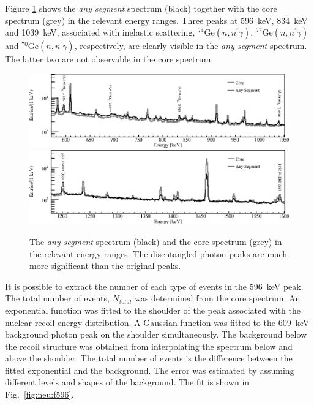 Figure \ref{fig:neu:cas} shows the \emph{any segment} spectrum (black) together with the core spectrum (grey) in the relevant energy ranges. Three peaks at 596~keV, 834~keV and 1039~keV, associated with inelastic scattering, $^{74}$Ge$(n, n^\prime\gamma)$, $^{72}$Ge$(n, n^\prime\gamma)$ and $^{70}$Ge$(n, n^\prime\gamma)$, respectively, are clearly visible in the \emph{any segment} spectrum. The latter two are not observable in the core spectrum.

\begin{figure}[tbhp]
\centering
\includegraphics[width=\textwidth,clip]{spe_casp}
\includegraphics[width=\textwidth,clip]{spe_cas2p}
\caption{The \emph{any segment} spectrum (black) and the core spectrum (grey) in the relevant energy ranges. The disentangled photon peaks are much more significant than the original peaks.}
\label{fig:neu:cas}
\end{figure}

It is possible to extract the number of each type of events in the 596~keV peak. The total number of events, $N_{total}$ was determined from the core spectrum. An exponential function was fitted to the shoulder of the peak associated with the nuclear recoil energy distribution. A Gaussian function was fitted to the 609~keV background photon peak on the shoulder simultaneously. The background below the recoil structure was obtained from interpolating the spectrum below and above the shoulder. The total number of events is the difference between the fitted exponential and the background. The error was estimated by assuming different levels and shapes of the background. The fit is shown in Fig.~\ref{fig:neu:f596}.

